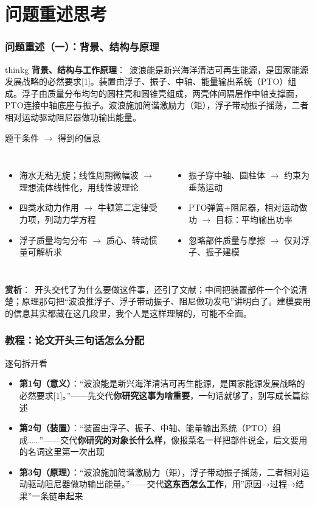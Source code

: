 \documentclass[aspectratio=169]{beamer}
\newcommand{\remarkg}[2]{%
	\vspace{0.12cm}%
	\begin{beamercolorbox}[rounded=true,sep=6pt]{thinkg}%
		{\color{orchidgold}\textbf{#1}：}~#2%
	\end{beamercolorbox}%
}
\newcommand{\remarkp}[2]{%
	\vspace{0.12cm}%
	{\color{orchidpurple}\textbf{#1}：}~#2\par%
}
\begin{document}
\section{问题重述思考}
\begin{frame}
	\frametitle{问题重述（一）：背景、结构与原理}
	\scriptsize
	\setlength{\parskip}{0pt}
	\remarkg{背景、结构与工作原理}{波浪能是新兴海洋清洁可再生能源，是国家能源发展战略的必然要求[1]。装置由浮子、振子、中轴、能量输出系统（PTO）组成。浮子由质量分布均匀的圆柱壳和圆锥壳组成，两壳体间隔层作中轴支撑面，PTO连接中轴底座与振子。波浪施加简谐激励力（矩），浮子带动振子摇荡，二者相对运动驱动阻尼器做功输出能量。}
	\begin{block}{题干条件 $\rightarrow$ 得到的信息}
		\setlength{\itemsep}{0pt}\setlength{\topsep}{0pt}\setlength{\partopsep}{0pt}
		\begin{columns}[T]
			\begin{itemize}
				\item 海水无粘无旋；线性周期微幅波 $\rightarrow$ 理想流体线性化，用线性波理论
				\item 四类水动力作用 $\rightarrow$ 牛顿第二定律受力项，列动力学方程
				\item 浮子质量均匀分布 $\rightarrow$ 质心、转动惯量可解析求
			\end{itemize}
			\begin{itemize}
				\item 振子穿中轴、圆柱体 $\rightarrow$ 约束为垂荡运动
				\item PTO弹簧+阻尼器，相对运动做功 $\rightarrow$ 目标：平均输出功率
				\item 忽略部件质量与摩擦 $\rightarrow$ 仅对浮子、振子建模
			\end{itemize}
		\end{columns}
	\end{block}
	\remarkp{赏析}{开头交代了为什么要做这件事，还引了文献；中间把装置部件一个个说清楚；原理那句把``波浪推浮子、浮子带动振子、阻尼做功发电''讲明白了。建模要用的信息其实都藏在这几段里，我个人是这样理解的，可能不全面。}
\end{frame}

\begin{frame}
	\frametitle{教程：论文开头三句话怎么分配}
	\scriptsize
	\begin{block}{逐句拆开看}
		\begin{itemize}
			\item \textbf{第1句（意义）}：``波浪能是新兴海洋清洁可再生能源，是国家能源发展战略的必然要求[1]。''——先交代\textbf{你研究这事为啥重要}，一句话就够了，别写成长篇综述
			\item \textbf{第2句（装置）}：``装置由浮子、振子、中轴、能量输出系统（PTO）组成……''——交代\textbf{你研究的对象长什么样}，像报菜名一样把部件说全，后文要用的名词这里第一次出现
			\item \textbf{第3句（原理）}：``波浪施加简谐激励力（矩），浮子带动振子摇荡，二者相对运动驱动阻尼器做功输出能量。''——交代\textbf{这东西怎么工作}，用''原因→过程→结果''一条链串起来
		\end{itemize}
	\end{block}

\end{frame}
\end{document}
